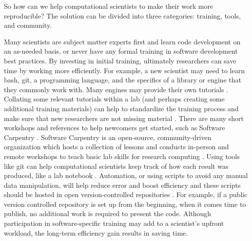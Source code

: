 So how can we help computational scientists to make their work more reproducible?
The solution can be divided into three categories: training, tools, and community.

Many scientists are subject matter experts first and learn code development on an as-needed basis, or never have any formal training in software development best practices. 
By investing in initial training, ultimately researchers can save time by working more efficiently.
For example, a new scientist may need to learn bash, git, a programming language, and the specifics of a library or engine that they commonly work with.
Many engines may provide their own tutorials \cite{hoomd_tutorials, Lemkul2019, Lemkul2020}.
Collating some relevant tutorials within a lab (and perhaps creating some additional training materials) can help to standardize the training process and make sure that new researchers are not missing material \cite{notebooktutorials}.
There are many short workshops and references to help newcomers get started, such as Software Carpentry \cite{Wilson2014}.
Software Carpentry is an open-source, community-driven organization which hosts a collection of lessons and conducts in-person and remote workshops to teach basic lab skills for research computing \cite{swc-main}.
Using tools like git can help computational scientists keep track of how each result was produced, like a lab notebook \cite{Sandve2013}.
Automation, or using scripts to avoid any manual data manipulation, will help reduce error and boost efficiency and these scripts should be hosted in open version-controlled repositories \cite{Sandve2013}.
For example, if a public version controlled repository is set up from the beginning, when it comes time to publish, no additional work is required to present the code.
Although participation in software-specific training may add to a scientist's upfront workload, the long-term efficiency gain results in saving time.

